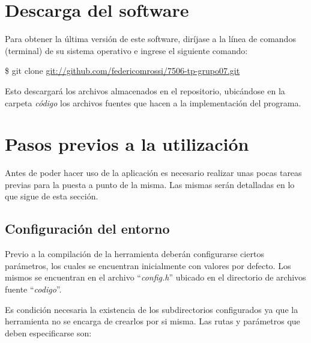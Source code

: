 \documentclass{article}
\begin{document}
\section{Descarga del software}

	Para obtener la última versión de este software, diríjase a la línea de comandos (terminal) de su sistema operativo e ingrese el siguiente comando:
	\bigskip

	\colorbox{gray95}{{\ttfamily\footnotesize
	\$ git clone \url{git://github.com/federicomrossi/7506-tp-grupo07.git}\\}}
	\bigskip

	Esto descargará los archivos almacenados en el repositorio, ubicándose en la carpeta \textit{código} los archivos fuentes que hacen a la implementación del programa.
\bigskip\medskip




\section{Pasos previos a la utilización}

	Antes de poder hacer uso de la aplicación es necesario realizar unas pocas tareas previas para la puesta a punto de la misma. Las mismas serán detalladas en lo que sigue de esta sección.
	\bigskip



\subsection{Configuración del entorno}

	Previo a la compilación de la herramienta deberán configurarse ciertos parámetros, los cuales se encuentran inicialmente con valores por defecto. Los mismos se encuentran en el archivo ``\textit{config.h}'' ubicado en el directorio de archivos fuente ``\textit{codigo}''.
	\par
	Es condición necesaria la existencia de los subdirectorios configurados ya que la herramienta no se encarga de crearlos por si misma. Las rutas y parámetros que deben especificarse son:
	\medskip
\end{document}
